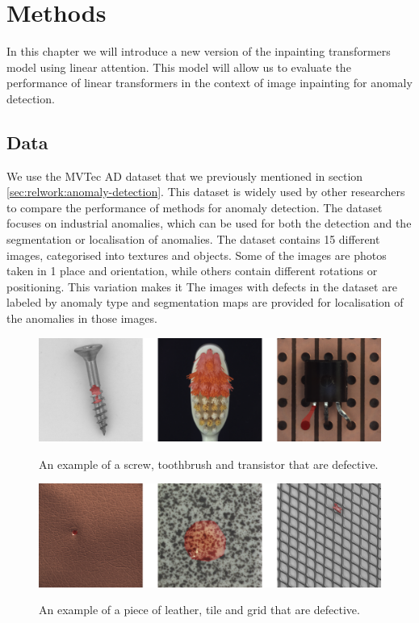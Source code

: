 \chapter{Methods}\label{ch:methods}

In this chapter we will introduce a new version of the inpainting transformers model using linear attention. This model will allow us to evaluate the performance of linear transformers in the context of image inpainting for anomaly detection.

\section{Data}

We use the MVTec AD dataset that we previously mentioned in section \ref{sec:relwork:anomaly-detection}. This dataset is widely used by other researchers to compare the performance of methods for anomaly detection. The dataset focuses on industrial anomalies, which can be used for both the detection and the segmentation or localisation of anomalies. The dataset contains 15 different images, categorised into textures and objects. Some of the images are photos taken in 1 place and orientation, while others contain different rotations or positioning. This variation makes it  The images with defects in the dataset are labeled by anomaly type and  segmentation maps are provided for localisation of the anomalies in those images.

\begin{figure}[h!]
\caption{An example of a screw, toothbrush and transistor that are defective.}
\centering
\includegraphics[width=\textwidth]{imgs/mvtec-example-objects.jpg}
\label{fig:methods:objects-example}
\end{figure}

\begin{figure}[h!]
\caption{An example of a piece of leather, tile and grid that are defective.}
\centering
\includegraphics[width=\textwidth]{imgs/mvtec-example-textures.jpg}
\label{fig:methods:textures-example}
\end{figure}

